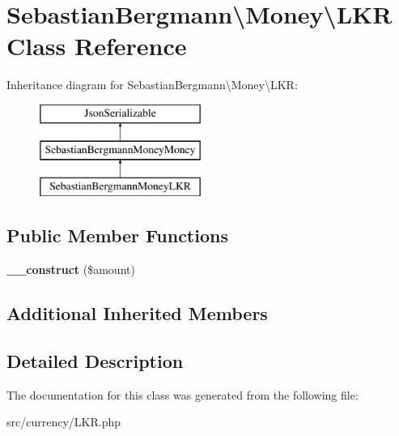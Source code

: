 \hypertarget{classSebastianBergmann_1_1Money_1_1LKR}{}\section{Sebastian\+Bergmann\textbackslash{}Money\textbackslash{}L\+K\+R Class Reference}
\label{classSebastianBergmann_1_1Money_1_1LKR}
Inheritance diagram for Sebastian\+Bergmann\textbackslash{}Money\textbackslash{}L\+K\+R\+:\begin{figure}[H]
\begin{center}
\leavevmode
\includegraphics[height=3.000000cm]{classSebastianBergmann_1_1Money_1_1LKR}
\end{center}
\end{figure}
\subsection*{Public Member Functions}
\begin{DoxyCompactItemize}
\item 
\hypertarget{classSebastianBergmann_1_1Money_1_1LKR_a5c2262df222e6e6c6af1a22be2dee03e}{}{\bfseries \+\_\+\+\_\+construct} (\$amount)\label{classSebastianBergmann_1_1Money_1_1LKR_a5c2262df222e6e6c6af1a22be2dee03e}

\end{DoxyCompactItemize}
\subsection*{Additional Inherited Members}


\subsection{Detailed Description}


The documentation for this class was generated from the following file\+:\begin{DoxyCompactItemize}
\item 
src/currency/L\+K\+R.\+php\end{DoxyCompactItemize}
